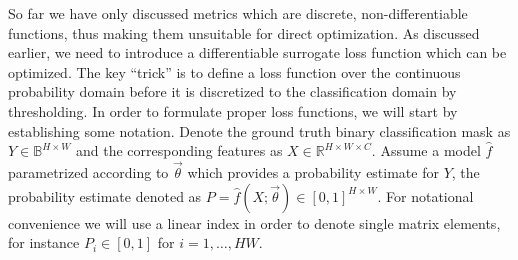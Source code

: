 So far we have only discussed metrics which are discrete, non-differentiable functions, thus making them unsuitable for direct optimization.
As discussed earlier, we need to introduce a differentiable surrogate loss function which can be optimized.
The key \enquote{trick} is to define a loss function over the continuous probability domain before it is discretized to the classification domain by thresholding.
In order to formulate proper loss functions, we will start by establishing some notation.
Denote the ground truth binary classification mask as $Y \in \mathbb{B}^{H \times W}$ and the corresponding features as $X \in \mathbb{R}^{H \times W \times C}$.
Assume a model $\hat{f}$ parametrized according to $\vec{\theta}$ which provides a probability estimate for $Y$, the probability estimate denoted as $P = \hat{f}(X; \vec{\theta}) \in [0, 1]^{H \times W}$.
For notational convenience we will use a linear index in order to denote single matrix elements, for instance $P_i \in [0, 1]$ for $i = 1, \ldots, HW$.

